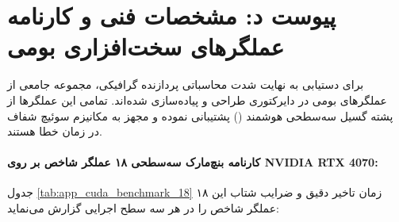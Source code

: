 \section*{پیوست د: مشخصات فنی و کارنامه عملگرهای سخت‌افزاری بومی }

برای دستیابی به نهایت شدت محاسباتی پردازنده گرافیکی، مجموعه جامعی از عملگرهای بومی  در دایرکتوری  طراحی و پیاده‌سازی شده‌اند. تمامی این عملگرها از پشته گسیل سه‌سطحی هوشمند () پشتیبانی نموده و مجهز به مکانیزم سوئیچ شفاف در زمان خطا هستند.

\paragraph{کارنامه بنچ‌مارک سه‌سطحی ۱۸ عملگر شاخص بر روی NVIDIA RTX 4070:}
جدول \ref{tab:app_cuda_benchmark_18} زمان تاخیر دقیق و ضرایب شتاب این ۱۸ عملگر شاخص را در هر سه سطح اجرایی گزارش می‌نماید:

